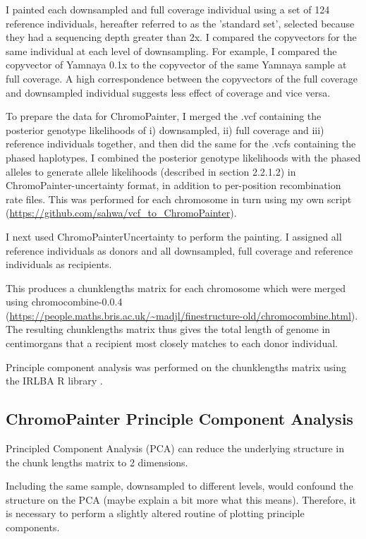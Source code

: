 I painted each downsampled and full coverage individual using a set of 124 reference individuals, hereafter referred to as the 'standard set', selected because they had a sequencing depth greater than 2x. I compared the copyvectors for the same individual at each level of downsampling. For example, I compared the copyvector of Yamnaya 0.1x to the copyvector of the same Yamnaya sample at full coverage. A high correspondence between the copyvectors of the full coverage and downsampled individual suggests less effect of coverage and vice versa. 

To prepare the data for ChromoPainter, I merged the .vcf containing the posterior genotype likelihoods of i) downsampled, ii) full coverage and iii) reference individuals together, and then did the same for the .vcfs containing the phased haplotypes.  I combined the posterior genotype likelihoods with the phased alleles to generate allele likelihoods (described in section 2.2.1.2) in ChromoPainter-uncertainty format, in addition to per-position recombination rate files. This was performed for each chromosome in turn using my own script (\url{https://github.com/sahwa/vcf_to_ChromoPainter}).

I next used ChromoPainterUncertainty to perform the painting. I assigned all reference individuals as donors and all downsampled, full coverage and reference individuals as recipients. 

This produces a chunklengths matrix for each chromosome which were merged using chromocombine-0.0.4 (\url{https://people.maths.bris.ac.uk/~madjl/finestructure-old/chromocombine.html}). The resulting chunklengths matrix thus gives the total length of genome in centimorgans that a recipient most closely matches to each donor individual. 

Principle component analysis was performed on the chunklengths matrix using the IRLBA R library \cite{baglama2005augmented}.

\subsection{ChromoPainter Principle Component Analysis}

Principled Component Analysis (PCA) can reduce the underlying structure in the chunk lengths matrix to 2 dimensions.

Including the same sample, downsampled to different levels, would confound the structure on the PCA (maybe explain a bit more what this means). Therefore, it is necessary to perform a slightly altered routine of plotting principle components. 

